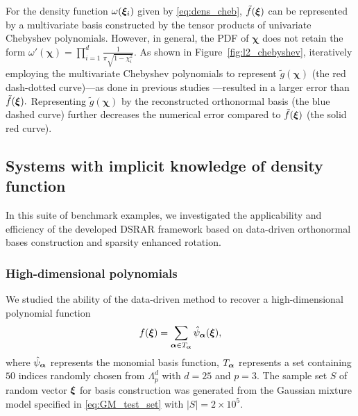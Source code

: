 For the density function $\omega(\bm\xi_i)$ given by \eqref{eq:dens_cheb}, $\tilde{f}(\bm\xi)$ can be represented by a multivariate 
basis constructed by the tensor products of univariate Chebyshev polynomials.
However, in general, the \ac{PDF} of $\bm\chi$ does not retain the form $\omega'(\bm\chi) = \prod_{i=1}^d \frac{1}{\pi \sqrt{1 - \chi_i^2}}$. 
As shown in Figure~\ref{fig:l2_chebyshev}, iteratively employing the multivariate Chebyshev polynomials to represent $\tilde{g}(\bm\chi)$ 
(the red dash-dotted curve)---as done in previous studies \cite{Yang_Wan_rotation_2017}---resulted in a larger error than $\tilde{f}(\bm\xi).$
Representing $\tilde{g}(\bm\chi)$ by the reconstructed orthonormal  basis (the blue dashed curve) further decreases 
the numerical error compared to $\tilde{f}(\bm\xi)$ (the solid red curve).


\subsection{Systems with implicit knowledge of density function}
In this suite of benchmark examples, we investigated  the applicability and efficiency of the developed \ac{DSRAR} framework based on 
data-driven orthonormal bases construction and sparsity enhanced rotation.

\subsubsection{High-dimensional polynomials} \label{sec:high_d_poly}
We studied the ability of the data-driven method to recover a high-dimensional polynomial function 
\begin{equation}
  f(\bm\xi) = \sum_{ \bm\alpha \in T_{\bm\alpha}} \hat{\psi}_{\bm\alpha}(\bm\xi),
\end{equation}
where $\hat{\psi}_{\bm\alpha}$ represents the monomial basis function, $T_{\bm\alpha}$ represents a set containing $50$ indices randomly chosen from $\Lambda_p^d$ with $d = 25$ and $p = 3$.
The sample set $S$ of random vector $\bm\xi$ for basis construction was generated from the Gaussian mixture model specified in \eqref{eq:GM_test_set} with $|S| = 2\times 10^5$. 

